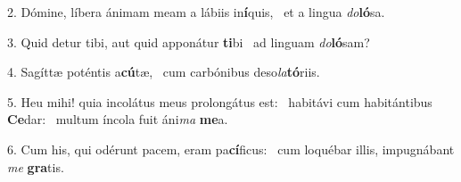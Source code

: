 2. Dómine, líbera ánimam meam a lábiis in\textbf{í}quis, \ast\  et a lingua \textit{do}\textbf{ló}sa.\

3. Quid detur tibi, aut quid apponátur \textbf{ti}bi \ast\  ad linguam \textit{do}\textbf{ló}sam?\

4. Sagíttæ poténtis a\textbf{cú}tæ, \ast\  cum carbónibus deso\textit{la}\textbf{tó}riis.\

5. Heu mihi! quia incolátus meus prolongátus est: \dag\  habitávi cum habitántibus \textbf{Ce}dar: \ast\  multum íncola fuit áni\textit{ma} \textbf{me}a.\

6. Cum his, qui odérunt pacem, eram pa\textbf{cí}ficus: \ast\  cum loquébar illis, impugnábant \textit{me} \textbf{gra}tis.\

